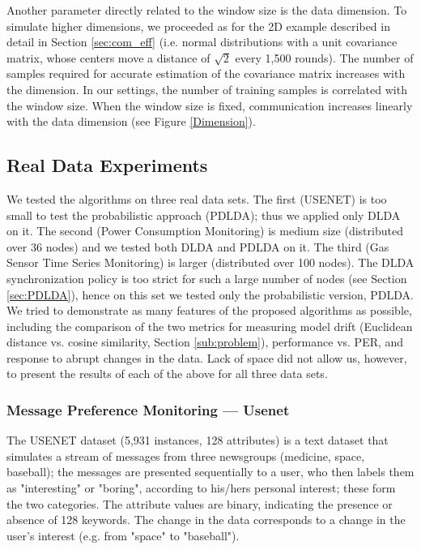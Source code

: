Another parameter directly related to the window size is the data dimension. To simulate higher dimensions, we proceeded as for the
2D example described in detail in Section \ref{sec:com_eff} (i.e. normal distributions with a unit covariance matrix, whose centers move a distance of $\sqrt{2}$ every
1,500 rounds).
The number of 
samples required for accurate estimation of the covariance matrix increases with the dimension. In our 
settings, the number of training samples is correlated with the window size. When the window size is fixed, 
communication increases linearly with the data dimension (see Figure \ref{Dimension}).
  
%
%

\subsection{Real Data Experiments}
\label{sec:real}
We tested the algorithms on three real data sets. The first
(USENET) is too small to test the probabilistic approach (PDLDA); thus we applied
only DLDA on it.
The second (Power Consumption Monitoring) is medium size  
(distributed over 36 nodes) and we tested both DLDA and PDLDA on it.
The third (Gas Sensor Time Series Monitoring) is larger (distributed over
100 nodes). The DLDA synchronization policy is too strict for such a large number of nodes
(see Section \ref{sec:PDLDA}),
hence on this set we tested only the probabilistic version, PDLDA.
%
We tried to demonstrate as many features of the proposed algorithms as possible,
including the comparison of the two metrics for measuring model
drift (Euclidean distance vs. cosine similarity, Section \ref{sub:problem}), 
performance vs. PER, and response to abrupt changes in the data. Lack of
space did not allow us, however, to present the results of each of the
above for all three data sets.

\subsubsection{Message Preference Monitoring --- Usenet}
The USENET dataset \cite{usenet} (5,931 instances, 128 attributes) is a text dataset that simulates a stream of messages from three newsgroups (medicine, space, baseball); 
the messages are presented sequentially to a user, who then labels them as "interesting" or "boring", 
according to his/hers personal interest; these form the two categories.
The attribute values are binary, indicating the presence or absence of 128 keywords. 
The change in the data corresponds to a change in the user's interest (e.g. from "space" to "baseball"). 

